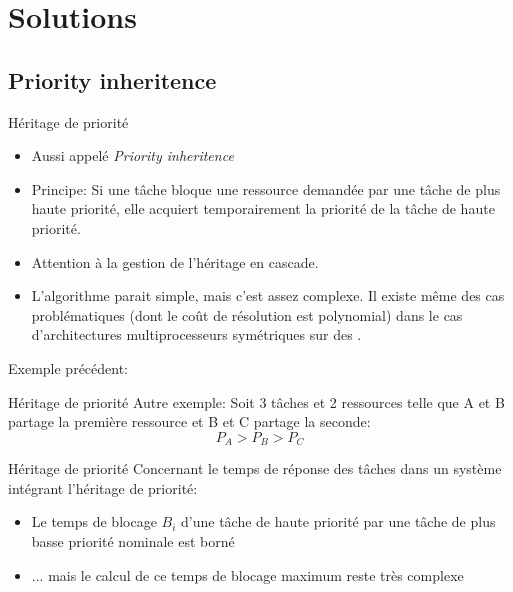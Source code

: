 \section{Solutions}

\subsection{Priority inheritence}

\begin{frame}{Héritage de priorité}
  \begin{itemize}
  \item Aussi appelé \emph{Priority inheritence}
  \item Principe: Si  une tâche bloque une ressource  demandée par une
    tâche  de plus  haute  priorité, elle  acquiert temporairement  la
    priorité de la tâche de haute priorité.
  \item Attention à la gestion de l'héritage en cascade.
  \item  L'algorithme parait  simple,  mais c'est  assez complexe.  Il
    existe même des cas problématiques (dont le coût de résolution est
    polynomial)   dans   le   cas   d'architectures   multiprocesseurs
    symétriques sur des .
  \end{itemize}
  Exemple précédent:
  \begin{center}
    
  \end{center}
\end{frame}

\begin{frame}{Héritage de priorité}
  Autre exemple:
  Soit 3 tâches et 2 ressources telle que A et B partage la première ressource et B et C partage la seconde:
  $$P_A > P_B > P_C$$
  \begin{center}
    
  \end{center}
\end{frame}

\begin{frame}{Héritage de priorité}
  Concernant le temps de réponse  des tâches dans un système intégrant
  l'héritage de priorité:
  \begin{itemize}
  \item Le  temps de blocage $B_i$  d'une tâche de  haute priorité par
    une tâche de plus basse priorité nominale est borné
  \item ...  mais le calcul de  ce temps de blocage maximum reste très
    complexe
  \end{itemize}
\end{frame}

